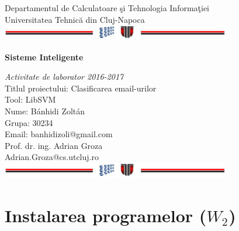 \documentclass[a4paper,12pt]{report}
\begin{document}
\vspace{-5cm}
\begin{center}
Departamentul de Calculatoare \c si Tehnologia Informa\c tiei\\
Universitatea Tehnic\u a din Cluj-Napoca\\
\includegraphics[width=10cm]{fig/footer}
\end{center}
\vspace{1cm}
\begin{center}
  \begin{Large}
    \textbf{Sisteme Inteligente}\\
  \end{Large}
  
  \textit{Activitate de laborator 2016-2017}\\
  \vspace{3cm}
  Titlul proiectului: Clasificarea email-urilor\\
  Tool: LibSVM\\
  \vspace{1.5cm}
  Nume: B\'anhidi Zolt\'an\\
  Grupa: 30234\\
  Email: banhidizoli@gmail.com\\
  
  \vspace{6cm}
  Prof. dr. ing. Adrian Groza\\
  Adrian.Groza@cs.utcluj.ro\\
  
  \vspace{1cm}
  \includegraphics[width=10cm]{fig/footer}
\end{center}

\tableofcontents







\chapter{Instalarea programelor ($W_2$)}
\end{document}
